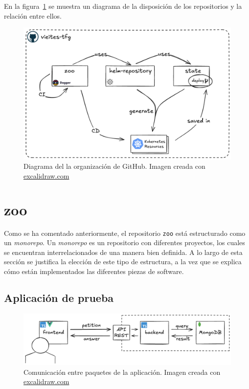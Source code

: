 En la figura~\ref{fig:ghorg} se muestra un diagrama de la disposición de los repositorios y la relación entre ellos.

\begin{figure}
  \centerline{\includegraphics[width=14cm]{figuras/vieites-tfg}}
  \caption{Diagrama del la organización de GitHub. Imagen creada con \href{https://excalidraw.com}{excalidraw.com}}
  \label{fig:ghorg}
\end{figure}

\section*{zoo}

Como se ha comentado anteriormente, el repositorio \texttt{zoo} está estructurado como un \textit{monorepo}. Un \textit{monorepo} es un repositorio con diferentes proyectos, los cuales se encuentran interrelacionados de una manera bien definida. A lo largo de esta sección se justifica la elección de este tipo de estructura, a la vez que se explica cómo están implementados las diferentes piezas de software.

\subsection*{Aplicación de prueba}

\begin{figure}
  \centerline{\includegraphics[width=15cm]{figuras/app}}
  \caption{Comunicación entre paquetes de la aplicación. Imagen creada con \href{https://excalidraw.com}{excalidraw.com}}
  \label{fig:app}
\end{figure}

